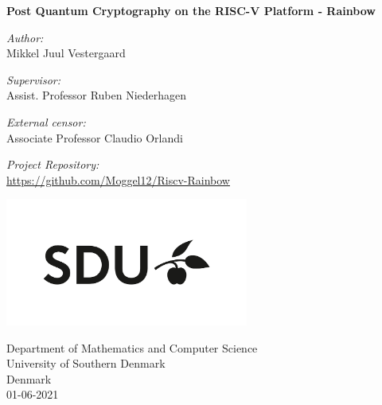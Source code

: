 \documentclass[11pt,a4paper]{article}       		%
\begin{document}
    \begin{titlepage}
    \begin{center}
        \vspace*{1cm}
            
        \LARGE
        \textbf{Post Quantum Cryptography on the RISC-V Platform - Rainbow}
            
        \vspace{2cm}
        
        \Large
        \emph{Author:}\\
        Mikkel Juul Vestergaard
        
        \vspace{0.5cm}
        \emph{Supervisor:}\\
        Assist. Professor Ruben Niederhagen
        
        \vspace{0.5cm}
        \emph{External censor:}\\
        Associate Professor Claudio Orlandi
        
        \vspace{1cm}
        \emph{Project Repository:}\\
        \url{https://github.com/Moggel12/Riscv-Rainbow}
        \vfill
        
        \vspace{0.8cm}
            
        \includegraphics[width=0.6\textwidth]{resources/SDU.jpeg}
            
        \Large
        Department of Mathematics and Computer Science\\
        University of Southern Denmark\\
        Denmark\\
        01-06-2021
            
    \end{center}
\end{titlepage}


    \thispagestyle{empty}%
    \newpage
    \thispagestyle{empty}
    \tableofcontents %

    \newpage
    \nocite{*}
        
        
        
        
        
        
        
        \pagebreak
        
        
        
\end{document}
